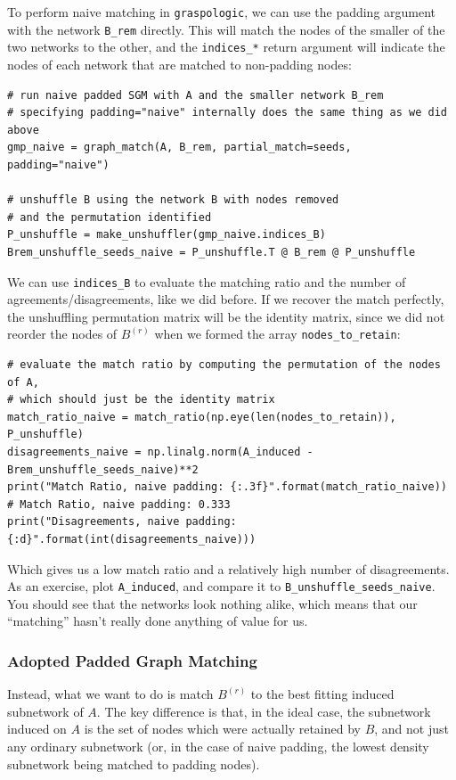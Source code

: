 To perform naive matching in \texttt{graspologic}, we can use the padding argument with the network \texttt{B\_rem} directly. This will match the nodes of the smaller of the two networks to the other, and the \texttt{indices\_*} return argument will indicate the nodes of each network that are matched to non-padding nodes:

\begin{lstlisting}[style=python]
# run naive padded SGM with A and the smaller network B_rem
# specifying padding="naive" internally does the same thing as we did above
gmp_naive = graph_match(A, B_rem, partial_match=seeds, padding="naive")

# unshuffle B using the network B with nodes removed
# and the permutation identified
P_unshuffle = make_unshuffler(gmp_naive.indices_B)
Brem_unshuffle_seeds_naive = P_unshuffle.T @ B_rem @ P_unshuffle
\end{lstlisting}

We can use \texttt{indices\_B} to evaluate the matching ratio and the number of agreements/disagreements, like we did before. If we recover the match perfectly, the unshuffling permutation matrix will be the identity matrix, since we did not reorder the nodes of $B^{(r)}$ when we formed the array \texttt{nodes\_to\_retain}:

\begin{lstlisting}[style=python]
# evaluate the match ratio by computing the permutation of the nodes of A,
# which should just be the identity matrix
match_ratio_naive = match_ratio(np.eye(len(nodes_to_retain)), P_unshuffle)
disagreements_naive = np.linalg.norm(A_induced - Brem_unshuffle_seeds_naive)**2
print("Match Ratio, naive padding: {:.3f}".format(match_ratio_naive))
# Match Ratio, naive padding: 0.333
print("Disagreements, naive padding: {:d}".format(int(disagreements_naive)))
\end{lstlisting}

Which gives us a low match ratio and a relatively high number of disagreements. As an exercise, plot \texttt{A\_induced}, and compare it to \texttt{B\_unshuffle\_seeds\_naive}. You should see that the networks look nothing alike, which means that our ``matching'' hasn't really done anything of value for us.

\subsubsection*{Adopted Padded Graph Matching}

Instead, what we want to do is match $B^{(r)}$ to the best fitting induced subnetwork of $A$. The key difference is that, in the ideal case, the subnetwork induced on $A$ is the set of nodes which were actually retained by $B$, and not just any ordinary subnetwork (or, in the case of naive padding, the lowest density subnetwork being matched to padding nodes).

